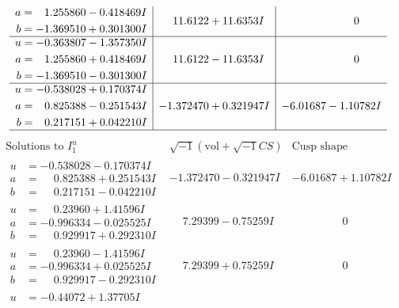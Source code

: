 \documentclass[1p]{elsarticle_modified}
\theoremstyle{definition}
\newcommand{\I}{\sqrt{-1}}
\begin{document}
$$\begin{array}{c|c|c}
\begin{aligned}
a &= \phantom{-}1.255860 - 0.418469 I \\
b &= -1.369510 + 0.301300 I\end{aligned}
 & \phantom{-}11.6122 + 11.6353 I & \phantom{-0.000000 } 0 \\ \hline\begin{aligned}
u &= -0.363807 - 1.357350 I \\
a &= \phantom{-}1.255860 + 0.418469 I \\
b &= -1.369510 - 0.301300 I\end{aligned}
 & \phantom{-}11.6122 - 11.6353 I & \phantom{-0.000000 } 0 \\ \hline\begin{aligned}
u &= -0.538028 + 0.170374 I \\
a &= \phantom{-}0.825388 - 0.251543 I \\
b &= \phantom{-}0.217151 + 0.042210 I\end{aligned}
 & -1.372470 + 0.321947 I & -6.01687 - 1.10782 I\\
 \hline 
 \end{array}$$\newpage$$\begin{array}{c|c|c}  
\text{Solutions to }I^u_{1}& \I (\text{vol} + \sqrt{-1}CS) & \text{Cusp shape}\\
 \hline 
\begin{aligned}
u &= -0.538028 - 0.170374 I \\
a &= \phantom{-}0.825388 + 0.251543 I \\
b &= \phantom{-}0.217151 - 0.042210 I\end{aligned}
 & -1.372470 - 0.321947 I & -6.01687 + 1.10782 I \\ \hline\begin{aligned}
u &= \phantom{-}0.23960 + 1.41596 I \\
a &= -0.996334 - 0.025525 I \\
b &= \phantom{-}0.929917 + 0.292310 I\end{aligned}
 & \phantom{-}7.29399 - 0.75259 I & \phantom{-0.000000 } 0 \\ \hline\begin{aligned}
u &= \phantom{-}0.23960 - 1.41596 I \\
a &= -0.996334 + 0.025525 I \\
b &= \phantom{-}0.929917 - 0.292310 I\end{aligned}
 & \phantom{-}7.29399 + 0.75259 I & \phantom{-0.000000 } 0 \\ \hline\begin{aligned}
u &= -0.44072 + 1.37705 I \\

\end{aligned}
\end{array}$$
\end{document}
